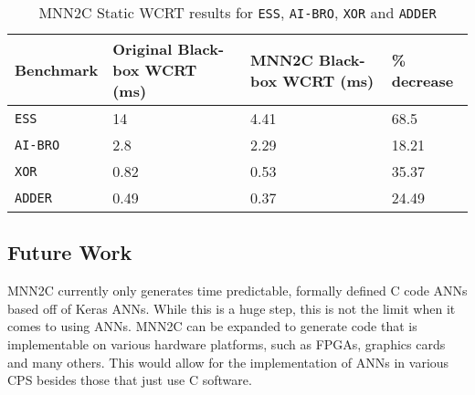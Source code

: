 \begin{table}[H]
	\centering
	\caption{MNN2C Static \ac{WCRT} results for \texttt{ESS}, \texttt{AI-BRO}, \texttt{XOR} and \texttt{ADDER}}
	\label{tbl:res-mnn2c}
	\begin{tabular}{|p{}|p{}|p{}|p{}|}
		\hline
		Benchmark         & Original Black-box WCRT (ms) & MNN2C Black-box WCRT (ms)  &  \% \textbf{decrease} \\ \hline
		\texttt{ESS}        & 14 & 4.41 & 68.5 \\  \hline
		\texttt{AI-BRO}        & 2.8 & 2.29 & 18.21 \\ \hline
		\texttt{XOR}        & 0.82 & 0.53 & 35.37 \\  \hline
		\texttt{ADDER}        & 0.49 & 0.37 & 24.49 \\ \hline
	\end{tabular}
\end{table}

\subsection{Future Work}
\ac{MNN2C} currently only generates time predictable, formally defined C code \acp{ANN} based off of Keras \acp{ANN}.
While this is a huge step, this is not the limit when it comes to using \acp{ANN}.
\ac{MNN2C} can be expanded to generate code that is implementable on various hardware platforms, such as \acp{FPGA}, graphics cards and many others.
This would allow for the implementation of \acp{ANN} in various \ac{CPS} besides those that just use C software.







